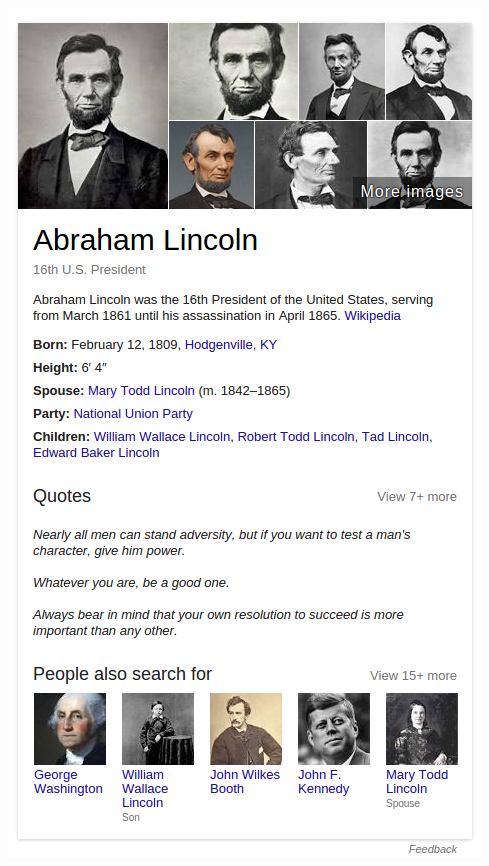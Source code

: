 \documentclass{beamer}
\begin{document}
\begin{frame}
  \begin{center}
    \includegraphics[height=\textheight]{abelincoln}
  \end{center}
\end{frame}

\end{document}
